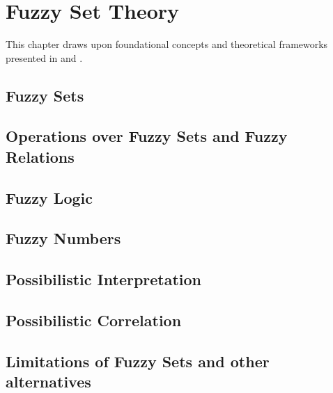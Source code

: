 \chapter{Fuzzy Set Theory}
This chapter draws upon foundational concepts and theoretical frameworks presented in \cite{FULLER1} and \cite{FULLER2}. 

\section{Fuzzy Sets}

\section{Operations over Fuzzy Sets and Fuzzy Relations}

\section{Fuzzy Logic}\label{sec:fuzzy_logic}

\section{Fuzzy Numbers}\label{sec:fuzzy_numbers}

\section{Possibilistic Interpretation}


\section{Possibilistic Correlation}
\section{Limitations of Fuzzy Sets and other alternatives}
